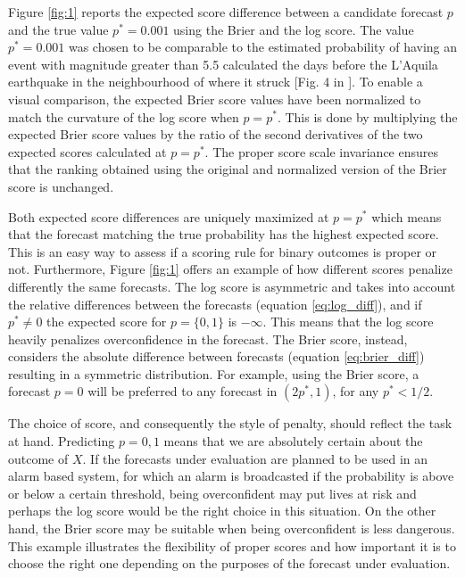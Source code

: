\documentclass[referee,sn-basic]{sn-jnl}
\theoremstyle{thmstyleone}%
\theoremstyle{thmstyletwo}%
\theoremstyle{thmstylethree}%
\begin{document}
Figure \ref{fig:1} reports the expected score difference between a candidate forecast $p$ and the true value $p^* = 0.001$ using the Brier and the log score. The value $p^* = 0.001$ was chosen to be comparable to the estimated probability of having an event with magnitude greater than 5.5 calculated the days before the L'Aquila earthquake in the neighbourhood of where it struck [Fig. 4 in \cite{marzocchi2009real}]. To enable a visual comparison, the expected Brier score values have been normalized to match the curvature of the log score when $p = p^*$. This is done by multiplying the expected Brier score values by the ratio of the second derivatives of the two expected scores calculated at $p = p^*$. The proper score scale invariance ensures that the ranking obtained using the original and normalized version of the Brier score is unchanged. 

Both expected score differences are uniquely maximized at $p = p^*$ which means that the forecast matching the true probability has the highest expected score. This is an easy way to assess if a scoring rule for binary outcomes is proper or not. Furthermore, Figure \ref{fig:1} offers an example of how different scores penalize differently the same forecasts. The log score is asymmetric and takes into account the relative differences between the forecasts (equation \ref{eq:log_diff}), and if $p^* \neq 0$ the expected score for $p = \{0,1\}$ is $-\infty$. This means that the log score heavily penalizes overconfidence in the forecast. The Brier score, instead, considers the absolute difference between forecasts (equation \ref{eq:brier_diff}) resulting in a symmetric distribution. For example, using the Brier score, a forecast $p = 0$ will be preferred to any forecast in $(2p^*, 1)$, for any $p^* < 1/2$.

The choice of score, and consequently the style of penalty, should reflect the task at hand. Predicting $p = 0, 1$ means that we are absolutely certain about the outcome of $X$. If the forecasts under evaluation are planned to be used in an alarm based system, for which an alarm is broadcasted if the probability is above or below a certain threshold, being overconfident may put lives at risk and perhaps the log score would be the right choice in this situation. On the other hand, the Brier score may be suitable when being overconfident is less dangerous. This example illustrates the flexibility of proper scores and how important it is to choose the right one depending on the purposes of the forecast under evaluation.   
\end{document}
